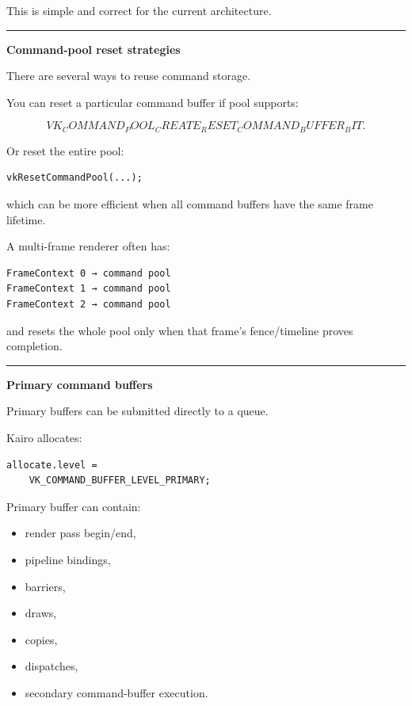 This is simple and correct for the current architecture.

\begin{center}\rule{0.5\linewidth}{0.5pt}\end{center}

\textbf{Command-pool reset strategies}

There are several ways to reuse command storage.

You can reset a particular command buffer if pool supports:

\[
VK_COMMAND_POOL_CREATE_RESET_COMMAND_BUFFER_BIT.
\]

Or reset the entire pool:

\begin{verbatim}
vkResetCommandPool(...);
\end{verbatim}

which can be more efficient when all command buffers have the same frame lifetime.

A multi-frame renderer often has:

\begin{verbatim}
FrameContext 0 → command pool
FrameContext 1 → command pool
FrameContext 2 → command pool
\end{verbatim}

and resets the whole pool only when that frame's fence/timeline proves completion.

\begin{center}\rule{0.5\linewidth}{0.5pt}\end{center}

\textbf{Primary command buffers}

Primary buffers can be submitted directly to a queue.

Kairo allocates:

\begin{verbatim}
allocate.level =
    VK_COMMAND_BUFFER_LEVEL_PRIMARY;
\end{verbatim}

Primary buffer can contain:

\begin{itemize}
\tightlist
\item
  render pass begin/end,
\item
  pipeline bindings,
\item
  barriers,
\item
  draws,
\item
  copies,
\item
  dispatches,
\item
  secondary command-buffer execution.
\end{itemize}

